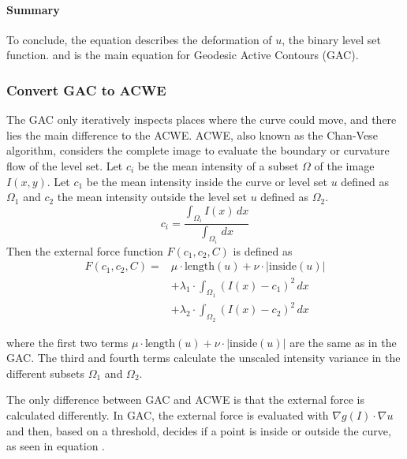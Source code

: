 \paragraph{Summary}
To conclude, the equation  describes the deformation of $u$, the binary level set function. and is the main equation for Geodesic Active Contours (GAC). 

\subsubsection{Convert GAC to ACWE}
\label{sus:acwe_ransac}
The GAC only iteratively inspects places where the curve could move, and there lies the main difference to the ACWE. ACWE, also known as the Chan-Vese algorithm, considers the complete image to evaluate the boundary or curvature flow of the level set. 
Let $c_i$ be the mean intensity of a subset $\Omega$ of the image $I(x,y)$. Let $c_1$ be the mean intensity inside the curve or level set $u$ defined as $\Omega_1$ and $c_2$ the mean intensity outside the level set $u$ defined as $\Omega_2$. 
\begin{equation}
    c_{i}= \frac{ \int_{\Omega_{i}} I(x) \,dx}{\int_{\Omega_{i}} \, dx }
    \label{eq:meanintensity}
\end{equation}
Then the external force function $F(c_1,c_2,C)$ is defined as
\begin{equation}
    \begin{split}
    F(c_1, c_2, C) = & \mu \cdot \text{length}(u) + \nu \cdot |\text{inside}(u)| \\
    & + \lambda_1 \cdot \int_{\Omega_1} (I(x) - c_1)^2 \, dx \\
    & + \lambda_2 \cdot \int_{\Omega_2} (I(x) - c_2)^2 \, dx
    \end{split}
    \label{eq:curvatureflow}
    \end{equation}

where the first two terms $\mu \cdot \text{length}(u) + \nu \cdot |\text{inside}(u)|$ are the same as in the GAC. The third and fourth terms calculate the unscaled intensity variance in the different subsets $\Omega_1$ and $\Omega_2$. 

The only difference between GAC and ACWE is that the external force is calculated differently. In GAC, the external force is evaluated with $\nabla g(I) \cdot \nabla u$ and then, based on a threshold, decides if a point is inside or outside the curve, as seen in equation . 

